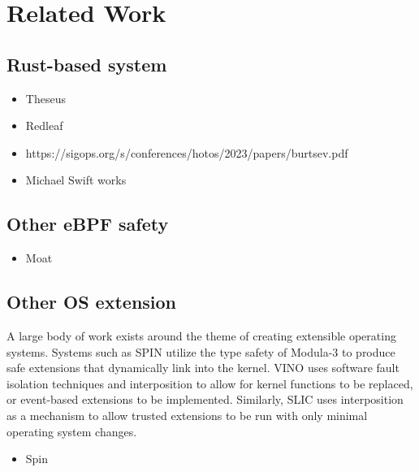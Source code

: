 \section{Related Work}
\subsection{Rust-based system}
\begin{itemize}
    \item Theseus
    \item Redleaf
    \item https://sigops.org/s/conferences/hotos/2023/papers/burtsev.pdf
    \item Michael Swift works
\end{itemize}

\subsection{Other eBPF safety}
\begin{itemize}
    \item Moat
\end{itemize}

\subsection{Other OS extension}
A large body of work exists around the theme of creating extensible operating systems.
Systems such as SPIN \cite{spin} utilize the type safety of Modula-3 to produce safe extensions that dynamically link into the kernel.
VINO \cite{vino} uses software fault isolation techniques and interposition to allow for kernel functions to be replaced, or event-based extensions to be implemented.
Similarly, SLIC \cite{slic} uses interposition as a mechanism to allow trusted extensions to be run with only minimal operating system changes.


\begin{itemize}
    \item Spin
\end{itemize}
